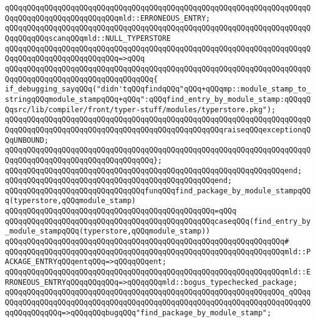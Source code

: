 \verb|qQQqqQQqqQQqqQQqqQQqqQQqqQQqqQQqqQQqqQQqqQQqqQQqqQQqqQQqqQQqqQQqqQQqqQQqqQQqqQQqqQQqqQQqqQQqqQQqmld::ERRONEOUS_ENTRY;|\newline
\newline
\verb|qQQqqQQqqQQqqQQqqQQqqQQqqQQqqQQqqQQqqQQqqQQqqQQqqQQqqQQqqQQqqQQqqQQqqQQqqQQqqQQqscanqQQqmld::NULL_TYPERSTORE|\newline
\verb|qQQqqQQqqQQqqQQqqQQqqQQqqQQqqQQqqQQqqQQqqQQqqQQqqQQqqQQqqQQqqQQqqQQqqQQqqQQqqQQqqQQqqQQqqQQqqQQq=>qQQq|\newline
\verb|qQQqqQQqqQQqqQQqqQQqqQQqqQQqqQQqqQQqqQQqqQQqqQQqqQQqqQQqqQQqqQQqqQQqqQQqqQQqqQQqqQQqqQQqqQQqqQQqqQQqqQQq{|\newline
\verb|if_debugging_sayqQQq("didn'tqQQqfindqQQq"qQQq+qQQqmp::module_stamp_to_stringqQQqmodule_stampqQQq+qQQq":qQQqfind_entry_by_module_stamp:qQQqqQQqsrc/lib/compiler/front/typer-stuff/modules/typerstore.pkg");|\newline
\verb|qQQqqQQqqQQqqQQqqQQqqQQqqQQqqQQqqQQqqQQqqQQqqQQqqQQqqQQqqQQqqQQqqQQqqQQqqQQqqQQqqQQqqQQqqQQqqQQqqQQqqQQqqQQqqQQqqQQqqQQqraiseqQQqexceptionqQQqUNBOUND;|\newline
\verb|qQQqqQQqqQQqqQQqqQQqqQQqqQQqqQQqqQQqqQQqqQQqqQQqqQQqqQQqqQQqqQQqqQQqqQQqqQQqqQQqqQQqqQQqqQQqqQQqqQQqqQQq};|\newline
\verb|qQQqqQQqqQQqqQQqqQQqqQQqqQQqqQQqqQQqqQQqqQQqqQQqqQQqqQQqqQQqqQQqend;|\newline
\verb|qQQqqQQqqQQqqQQqqQQqqQQqqQQqqQQqqQQqqQQqqQQqqQQqend;|\newline
\newline
\verb|qQQqqQQqqQQqqQQqqQQqqQQqqQQqqQQqfunqQQqfind_package_by_module_stampqQQq(typerstore,qQQqmodule_stamp)|\newline
\verb|qQQqqQQqqQQqqQQqqQQqqQQqqQQqqQQqqQQqqQQqqQQqqQQq=qQQq|\newline
\verb|qQQqqQQqqQQqqQQqqQQqqQQqqQQqqQQqqQQqqQQqqQQqqQQqcaseqQQq(find_entry_by_module_stampqQQq(typerstore,qQQqmodule_stamp))|\newline
\verb|qQQqqQQqqQQqqQQqqQQqqQQqqQQqqQQqqQQqqQQqqQQqqQQqqQQqqQQqqQQqqQQq#|\newline
\verb|qQQqqQQqqQQqqQQqqQQqqQQqqQQqqQQqqQQqqQQqqQQqqQQqqQQqqQQqqQQqqQQqmld::PACKAGE_ENTRYqQQqentqQQq=>qQQqqQQqent;|\newline
\verb|qQQqqQQqqQQqqQQqqQQqqQQqqQQqqQQqqQQqqQQqqQQqqQQqqQQqqQQqqQQqqQQqmld::ERRONEOUS_ENTRYqQQqqQQqqQQq=>qQQqqQQqmld::bogus_typechecked_package;|\newline
\verb|qQQqqQQqqQQqqQQqqQQqqQQqqQQqqQQqqQQqqQQqqQQqqQQqqQQqqQQqqQQqqQQq_qQQqqQQqqQQqqQQqqQQqqQQqqQQqqQQqqQQqqQQqqQQqqQQqqQQqqQQqqQQqqQQqqQQqqQQqqQQqqQQqqQQqqQQq=>qQQqqQQqbugqQQq"find_package_by_module_stamp";|\newline

